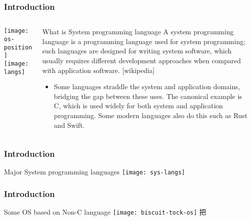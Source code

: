 \begin{frame}[plain]
	\frametitle{Introduction}
	
	
	
	\begin{columns}
		
		\begin{column}{.4\textwidth}
			
			\texttt{[image: os-position]}
			\texttt{[image: langs]}
		\end{column}
		
		\begin{column}{.6\textwidth}
			
			\begin{block}{What is System programming language}
				A system programming language is a programming language used for system programming; such languages are designed for writing system software, which usually requires different development approaches when compared with application software.   [wikipedia]
			\end{block} 
			
			
			\begin{itemize}
				\item Some languages straddle the system and application domains, bridging the gap between these uses. The canonical example is C, which is used widely for both system and application programming. Some modern languages also do this such as Rust and Swift.
				
			\end{itemize}
			
			
		\end{column}
		
		
	\end{columns}
	
	
\end{frame}


\begin{frame}[plain]
	\frametitle{Introduction}
	
	\centering
	Major System programming languages
	\texttt{[image: sys-langs]}
\end{frame}

\begin{frame}[plain]
	\frametitle{Introduction}
	
	\centering
	Some OS based on Non-C language
	\texttt{[image: biscuit-tock-os]}
把\end{frame}


